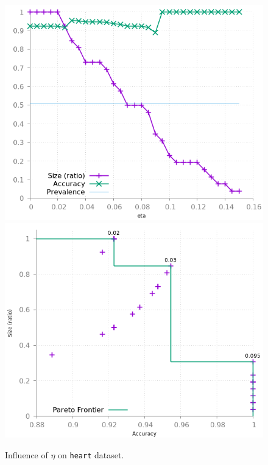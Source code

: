 \documentclass[preprint,12pt]{elsarticle}
\theoremstyle{definition}
\begin{document}
\begin{figure}[!h]
\centering
\includegraphics[scale=0.3]{img/meta_heart.png}
\hfill
\includegraphics[scale=0.3]{img/meta_pareto_heart.png}
\caption{Influence of $\eta$ on \texttt{heart} dataset.}
\label{fig:meta_heart}
\end{figure}
\end{document}
